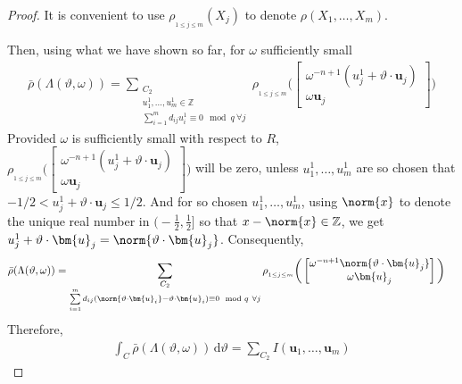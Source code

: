 \documentclass[11pt]{article}
\theoremstyle{definition}
\theoremstyle{proof}
\begin{document}
\begin{proof}
    It is convenient to use $\rho _{_{1 \leq j\leq m}}(X_j)$ to denote $\rho (X_1, \ldots, X_m)$.

    Then, using what we have shown so far, for $\omega$ sufficiently small
    \begin{align}\label{nrhobar}
        \bar{\rho} (\Lambda (\vartheta, \omega )) = \sum\limits_{\substack{C_2 \\ u_1^1, \ldots, u_m^1 \in \mathbb{Z} \\ \sum\limits_{i=1}^{m}d_{ij}u_i^1 \equiv 0 \mod q \ \forall j}} \rho _{_{1\leq j\leq m}} \bigg(
        \begin{bmatrix}
            \omega ^{-n+1}(u_j^1 + \vartheta \cdot \bm{u}_j) \\
            \omega \bm{u}_j
        \end{bmatrix}
        \bigg)
    \end{align}
    Provided $\omega$ is sufficiently small with respect to $R$, $\rho _{_{1\leq j\leq m}} \bigg(
    \begin{bmatrix}
        \omega ^{-n+1}(u_j^1 + \vartheta \cdot \bm{u}_j) \\
        \omega \bm{u}_j
    \end{bmatrix}
    \bigg)$ will be zero, unless $u_1^1, \ldots, u_m^1$ are so chosen that $-1/2 < u_j^1 + \vartheta \cdot \bm{u}_j \leq 1/2$.
    And for so chosen $u_1^1, \ldots, u_m^1$, using $\norm{x}$ to denote the unique real number in $\big(-\frac{1}{2}, \frac{1}{2}\big]$ so that $x-\norm{x} \in \mathbb{Z}$, we get $u_j^1+ \vartheta \cdot \bm{u}_j = \norm{\vartheta \cdot \bm{u}_j}$.
    Consequently,
    \begin{align*}
        \bar{\rho} (\Lambda (\vartheta, \omega )) &= \sum\limits_{\substack{C_2 \\ \sum\limits_{i=1}^{m}d_{ij}(\norm{\vartheta \cdot \bm{u}_i}- \vartheta \cdot \bm{u}_i) \equiv 0 \mod q \ \forall j}} \rho _{_{1\leq j\leq m}} \bigg(
        \begin{bmatrix}
            \omega ^{-n+1}\norm{\vartheta \cdot \bm{u}_j} \\
            \omega \bm{u}_j
        \end{bmatrix}
        \bigg)
    \end{align*}
    Therefore,
    \begin{align}\label{irhobar}
        \int_{C} \bar{\rho} (\Lambda (\vartheta, \omega )) \, \mathrm{d} \vartheta = \sum\limits_{C_2} I(\bm{u}_1, \ldots, \bm{u}_m)
    \end{align}

\end{proof}
\end{document}

